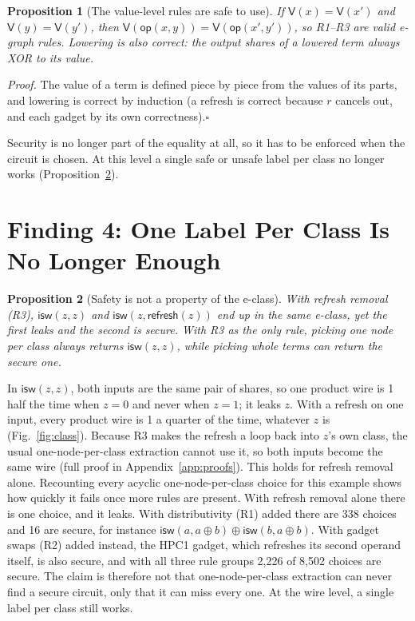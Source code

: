 \documentclass[conference]{IEEEtran}
\newtheorem{proposition}{Proposition}
\newcommand{\val}[1]{\mathsf{V}(#1)}
\newcommand{\rf}{\mathsf{refresh}}
\newcommand{\isw}{\mathsf{isw}}
\begin{document}
\begin{proposition}[The value-level rules are safe to use]
If $\val x=\val{x'}$ and $\val y=\val{y'}$, then $\val{\mathsf{op}(x,y)}=\val{\mathsf{op}(x',y')}$, so R1--R3 are valid e-graph rules. Lowering is also correct: the output shares of a lowered term always XOR to its value.
\end{proposition}
\emph{Proof.} The value of a term is defined piece by piece from the values of its parts, and lowering is correct by induction (a refresh is correct because $r$ cancels out, and each gadget by its own correctness).\hfill$\square$

Security is no longer part of the equality at all, so it has to be enforced when the circuit is chosen. At this level a single safe or unsafe label per class no longer works (Proposition~\ref{prop:vplc}).

\section{Finding 4: One Label Per Class Is No Longer Enough}\label{sec:extract}
\begin{proposition}[Safety is not a property of the e-class]\label{prop:vplc}
With refresh removal (R3), $\isw(z,z)$ and $\isw(z,\rf(z))$ end up in the same e-class, yet the first leaks and the second is secure. With R3 as the only rule, picking one node per class always returns $\isw(z,z)$, while picking whole terms can return the secure one.
\end{proposition}
In $\isw(z,z)$, both inputs are the same pair of shares, so one product wire is 1 half the time when $z=0$ and never when $z=1$; it leaks $z$. With a refresh on one input, every product wire is 1 a quarter of the time, whatever $z$ is (Fig.~\ref{fig:class}). Because R3 makes the refresh a loop back into $z$'s own class, the usual one-node-per-class extraction cannot use it, so both inputs become the same wire (full proof in Appendix~\ref{app:proofs}). This holds for refresh removal alone. Recounting every acyclic one-node-per-class choice for this example shows how quickly it fails once more rules are present. With refresh removal alone there is one choice, and it leaks. With distributivity (R1) added there are 338 choices and 16 are secure, for instance $\isw(a,a\oplus b)\oplus\isw(b,a\oplus b)$. With gadget swaps (R2) added instead, the HPC1 gadget, which refreshes its second operand itself, is also secure, and with all three rule groups 2,226 of 8,502 choices are secure. The claim is therefore not that one-node-per-class extraction can never find a secure circuit, only that it can miss every one. At the wire level, a single label per class still works.
\end{document}

